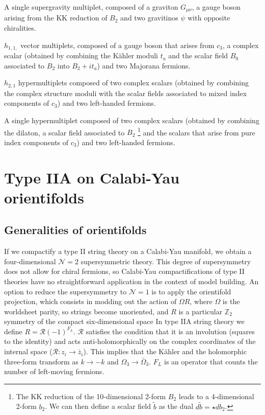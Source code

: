 A single supergravity multiplet, composed of a graviton $G_{\mu\nu}$, a gauge boson arising from the KK reduction of $B_2$ and two gravitinos $\psi$ with opposite chiralities. 

$h_{1,1,}$ vector multiplets, composed of a gauge boson that arises from $c_3$, a complex scalar (obtained by combining the Kähler moduli $t_a$ and the scalar field $B_0$ associated to $B_2$ into $B_2+it_a$) and two Majorana fermions.

$h_{2,1}$ hypermultiplets composed of two complex scalars (obtained by combining the complex structure moduli with the scalar fields associated to mixed index components of $c_3$) and two left-handed fermions.

A single hypermultiplet composed of two complex scalars (obtained by combining the dilaton, a scalar field associated to $B_2$
\footnote{The KK reduction of the 10-dimensional 2-form $B_2$ leads to a 4-dimensional 2-form $b_2$.
We can then define a scalar field $\tilde b$ as the dual $d \tilde b = \star d b_2$.} and the scalars that arise from pure index components of $c_3$) and two left-handed fermions.

\section{Type IIA on Calabi-Yau orientifolds}

\subsection{Generalities of orientifolds}
If we compactify a type II string theory on a Calabi-Yau manifold, we  obtain a four-dimensional
$\mathcal N=2$ supersymmetric theory.
This degree of supersymmetry does not allow for chiral fermions, so Calabi-Yau compactifications
of type II theories have no straightforward application in the context of model building.
An option to reduce the supersymmetry to $\mathcal N=1$  is to apply the orientifold
projection, which consists in modding out the action of $\Omega R$,
where $\Omega$ is the worldsheet parity, so strings become unoriented, and
$R$ is a particular $\mathbb Z_2$ symmetry of the compact six-dimensional space
In type IIA string theory we define $R=\mathcal R (-1)^{F_L}$.
$\mathcal R$ satisfies the condition that it is an involution (squares to the identity) and 
acts anti-holomorphically on the complex coordinates of the internal space ($\mathcal R: z_i \to \bar z_i$).
This implies that the Kähler and the holomorphic three-form transform as $k\to -k$ and $\Omega_3 \to \bar \Omega_3$.
$F_L$ is an operator that counts the number of left-moving fermions.

